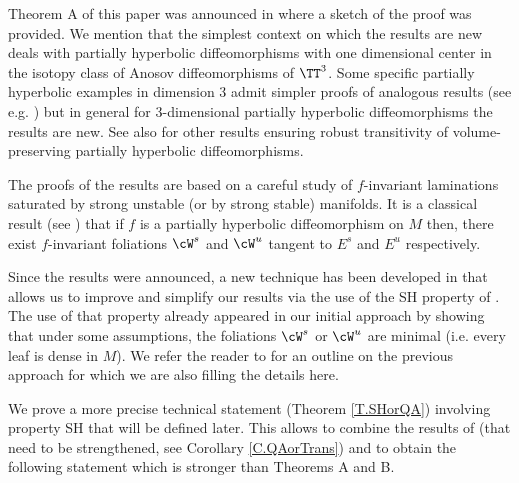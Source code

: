 \documentclass[a4paper,11pt]{amsart}
\numberwithin{equation}{section}     %
\theoremstyle{definition}
\theoremstyle{remark}
\begin{document}
Theorem A of this paper was announced in \cite[\S 5]{CroPot} where a sketch of the proof was provided. We mention that the simplest context on which the results are new deals with partially hyperbolic diffeomorphisms with one dimensional center in the isotopy class of Anosov diffeomorphisms of $\TT^3$. Some specific partially hyperbolic examples in dimension 3 admit simpler proofs of analogous results (see e.g. \cite[\S 5.6]{BGHP}) but in general for 3-dimensional partially hyperbolic diffeomorphisms the results are new. See also \cite{JYang} for other results ensuring robust transitivity of volume-preserving partially hyperbolic diffeomorphisms. 

The proofs of the results are based on a careful study of $f$-invariant laminations saturated by strong unstable (or by strong stable) manifolds. It is a classical result (see \cite{HPS, CroPot}) that if $f$ is a partially hyperbolic diffeomorphism on $M$ then, there exist $f$-invariant foliations $\cW^s$ and $\cW^{u}$ tangent to $E^s$ and $E^u$ respectively. 

Since the results were announced, a new technique has been developed in \cite{ACW} that allows us to improve and simplify our results via the use of the SH property of \cite{PS-SH}. The use of that property already appeared in our initial approach by showing that under some assumptions, the foliations $\cW^s$ or $\cW^u$ are minimal (i.e. every leaf is dense in $M$). We refer the reader to \cite{CroPot} for an outline on the previous approach for which we are also filling the details here.  

We prove a more precise technical statement (Theorem \ref{T.SHorQA}) involving property SH that will be defined later. This allows to combine the results of \cite{CPoS} (that need to be strengthened, see Corollary \ref{C.QAorTrans}) and \cite{ACW} to obtain the following statement which is stronger than Theorems A and B.
\end{document}
